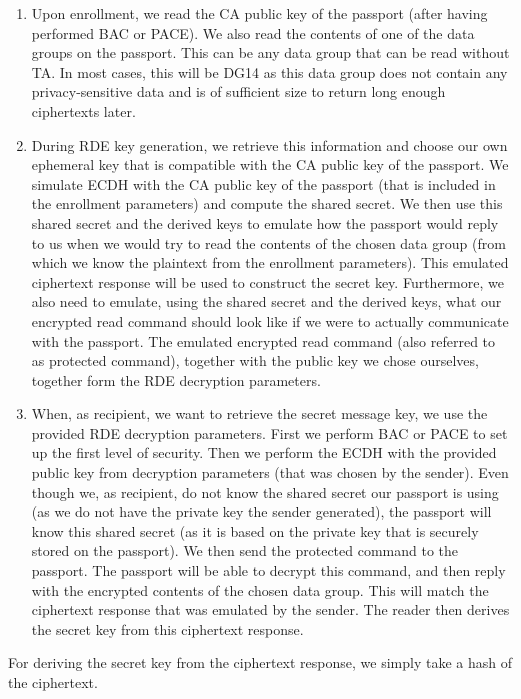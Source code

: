 \begin{enumerate}
    \item Upon enrollment, we read the CA public key of the passport (after having performed BAC or PACE).
    We also read the contents of one of the data groups on the passport.
    This can be any data group that can be read without TA.
    In most cases, this will be DG14 as this data group does not contain any privacy-sensitive data and is of sufficient size to return long enough ciphertexts later.
    \item During RDE key generation, we retrieve this information and choose our own ephemeral key that is compatible with the CA public key of the passport.
    We simulate ECDH with the CA public key of the passport (that is included in the enrollment parameters) and compute the shared secret.
    We then use this shared secret and the derived keys to emulate how the passport would reply to us when we would try to read the contents of the chosen data group (from which we know the plaintext from the enrollment parameters).
    This emulated ciphertext response will be used to construct the secret key.
    Furthermore, we also need to emulate, using the shared secret and the derived keys, what our encrypted read command should look like if we were to actually communicate with the passport.
    The emulated encrypted read command (also referred to as protected command), together with the public key we chose ourselves, together form the RDE decryption parameters.
    \item When, as recipient, we want to retrieve the secret message key, we use the provided RDE decryption parameters.
    First we perform BAC or PACE to set up the first level of security.
    Then we perform the ECDH with the provided public key from decryption parameters (that was chosen by the sender).
    Even though we, as recipient, do not know the shared secret our passport is using (as we do not have the private key the sender generated), the passport will know this shared secret (as it is based on the private key that is securely stored on the passport).
    We then send the protected command to the passport.
    The passport will be able to decrypt this command, and then reply with the encrypted contents of the chosen data group.
    This will match the ciphertext response that was emulated by the sender.
    The reader then derives the secret key from this ciphertext response.
\end{enumerate}

For deriving the secret key from the ciphertext response, we simply take a hash of the ciphertext.

